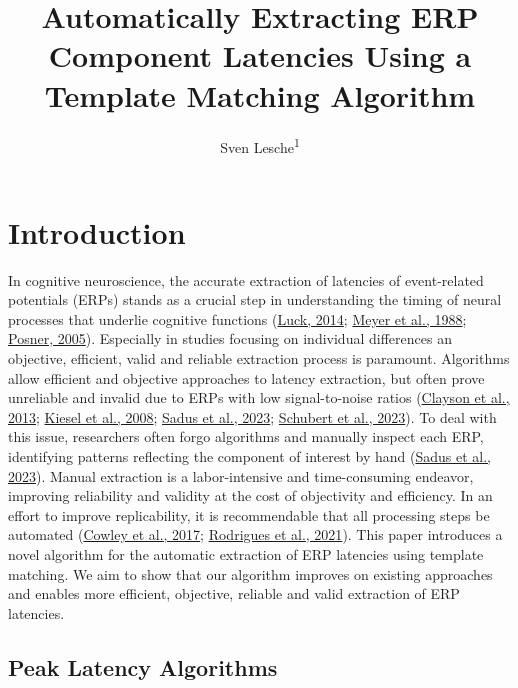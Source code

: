 \documentclass[
  man]{apa7}
\title{Automatically Extracting ERP Component Latencies Using a Template Matching Algorithm}
\author{Sven Lesche\textsuperscript{1}}
\date{}
\affiliation{\vspace{0.5cm}\textsuperscript{1} Ruprecht-Karls-University Heidelberg}
\begin{document}
\maketitle

\hypertarget{introduction}{%
\section{Introduction}\label{introduction}}

In cognitive neuroscience, the accurate extraction of latencies of event-related potentials (ERPs) stands as a crucial step in understanding the timing of neural processes that underlie cognitive functions (\protect\hyperlink{ref-luck2014introduction}{Luck, 2014}; \protect\hyperlink{ref-meyer1988modern}{Meyer et al., 1988}; \protect\hyperlink{ref-posner2005timing}{Posner, 2005}). Especially in studies focusing on individual differences an objective, efficient, valid and reliable extraction process is paramount. Algorithms allow efficient and objective approaches to latency extraction, but often prove unreliable and invalid due to ERPs with low signal-to-noise ratios (\protect\hyperlink{ref-clayson2013noise}{Clayson et al., 2013}; \protect\hyperlink{ref-kiesel2008measurement}{Kiesel et al., 2008}; \protect\hyperlink{ref-sadus2023multiverse}{Sadus et al., 2023}; \protect\hyperlink{ref-schubert2023robust}{Schubert et al., 2023}). To deal with this issue, researchers often forgo algorithms and manually inspect each ERP, identifying patterns reflecting the component of interest by hand (\protect\hyperlink{ref-sadus2023multiverse}{Sadus et al., 2023}). Manual extraction is a labor-intensive and time-consuming endeavor, improving reliability and validity at the cost of objectivity and efficiency. In an effort to improve replicability, it is recommendable that all processing steps be automated (\protect\hyperlink{ref-cowley2017computational}{Cowley et al., 2017}; \protect\hyperlink{ref-rodrigues2021epos}{Rodrigues et al., 2021}). This paper introduces a novel algorithm for the automatic extraction of ERP latencies using template matching. We aim to show that our algorithm improves on existing approaches and enables more efficient, objective, reliable and valid extraction of ERP latencies.

\hypertarget{peak-latency-algorithms}{%
\subsection{Peak Latency Algorithms}\label{peak-latency-algorithms}}
\end{document}
